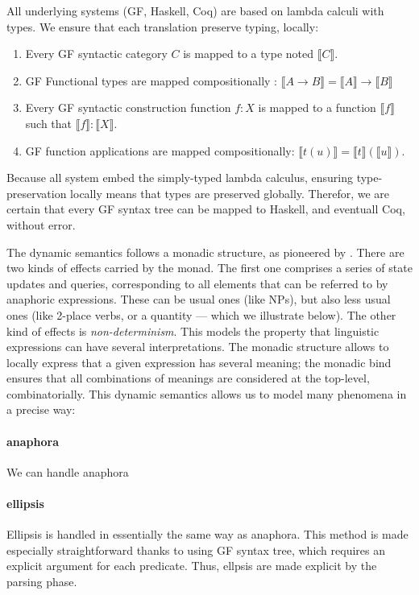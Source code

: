 \documentclass{article}
\begin{document}
All underlying systems (GF, Haskell, Coq) are based on lambda calculi
with types. We ensure that each translation preserve typing, locally:
\begin{enumerate}
\item Every GF syntactic category $C$ is mapped to a type noted $⟦C⟧$.
\item GF Functional types are mapped compositionally : $⟦A → B⟧ = ⟦A⟧ → ⟦B⟧$
\item Every GF syntactic construction function $f : X$ is mapped to a function $⟦f⟧$ such that $⟦f⟧ : ⟦X⟧$.
\item GF function applications are mapped compositionally: $⟦t(u)⟧ = ⟦t⟧ (⟦u⟧)$.
\end{enumerate}
Because all system embed the simply-typed lambda calculus, ensuring
type-preservation locally means that types are preserved globally.
Therefor, we are certain that every GF syntax tree can be mapped to
Haskell, and eventuall Coq, without error.

The dynamic semantics follows a monadic structure, as pioneered by
\citet{Shan:2002}. There are two kinds of effects carried by the
monad.  The first one comprises a series of state updates and queries,
corresponding to all elements that can be referred to by anaphoric
expressions. These can be usual ones (like NPs), but also less usual
ones (like 2-place verbs, or a quantity --- which we illustrate
below). The other kind of effects is \emph{non-determinism}. This
models the property that linguistic expressions can have several
interpretations. The monadic structure allows to locally express that
a given expression has several meaning; the monadic bind ensures that
all combinations of meanings are considered at the top-level,
combinatorially. This dynamic semantics allows us to model many
phenomena in a precise way:

\paragraph{anaphora} We can handle anaphora %

\paragraph{ellipsis} Ellipsis is handled in essentially the same way
as anaphora. This method is made especially straightforward thanks to
using GF syntax tree, which requires an explicit argument for each
predicate. Thus, ellpsis are made explicit by the parsing phase.
\end{document}

